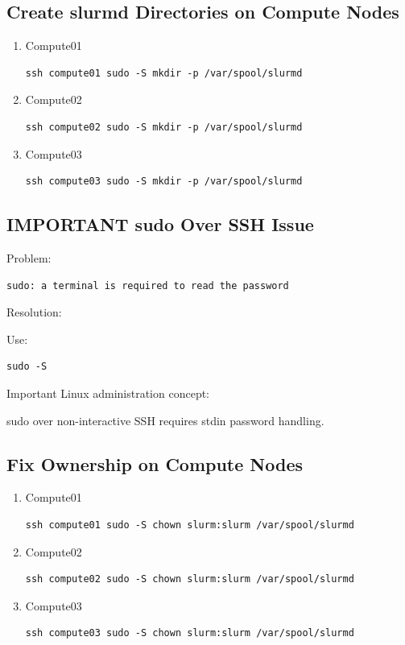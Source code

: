 \documentclass[11pt]{article}
\begin{document}
\subsection{Create slurmd Directories on Compute Nodes}
\label{sec:orgbe7b17a}
\begin{enumerate}
\item Compute01
\label{sec:orgd49f16b}

\begin{verbatim}
ssh compute01 sudo -S mkdir -p /var/spool/slurmd
\end{verbatim}
\item Compute02
\label{sec:org8c36984}

\begin{verbatim}
ssh compute02 sudo -S mkdir -p /var/spool/slurmd
\end{verbatim}
\item Compute03
\label{sec:orgb013b24}

\begin{verbatim}
ssh compute03 sudo -S mkdir -p /var/spool/slurmd
\end{verbatim}
\end{enumerate}
\subsection{IMPORTANT sudo Over SSH Issue}
\label{sec:org2e2cb1f}

Problem:

\begin{verbatim}
sudo: a terminal is required to read the password
\end{verbatim}

Resolution:

Use:

\begin{verbatim}
sudo -S
\end{verbatim}

Important Linux administration concept:

sudo over non-interactive SSH requires stdin password handling.
\subsection{Fix Ownership on Compute Nodes}
\label{sec:org4d1b09c}
\begin{enumerate}
\item Compute01
\label{sec:orga26893d}

\begin{verbatim}
ssh compute01 sudo -S chown slurm:slurm /var/spool/slurmd
\end{verbatim}
\item Compute02
\label{sec:org45f8edf}

\begin{verbatim}
ssh compute02 sudo -S chown slurm:slurm /var/spool/slurmd
\end{verbatim}
\item Compute03
\label{sec:orgf30dc7b}

\begin{verbatim}
ssh compute03 sudo -S chown slurm:slurm /var/spool/slurmd
\end{verbatim}
\end{enumerate}
\end{document}
